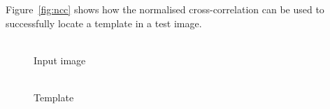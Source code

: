 \documentclass[12pt,a4paper,oneside,openright]{book}
\newcommand{\fig}[1]{Figure~\ref{fig:#1}}
\newcommand{\rarr}{\ding{224}} %
\begin{document}
\begin{CJK}{UTF8}{}
\fig{ncc} shows how the normalised cross-correlation can be used to successfully locate a template in a test image.
\begin{figure}[htbp]
  \begin{center}
    \begin{minipage}[c]{.42\textwidth}
      \begin{center}
        \\
        Input image
      \end{center}
    \end{minipage}
    \begin{minipage}[c]{.14\textwidth}
      \begin{center}
        \medskip\\
        {\Huge\rarr}
        Template
      \end{center}
    \end{minipage}
    \begin{minipage}[c]{.42\textwidth}
      \begin{center}
        \\

\end{center}
\end{minipage}
\end{center}
\end{figure}
\end{CJK}
\end{document}
